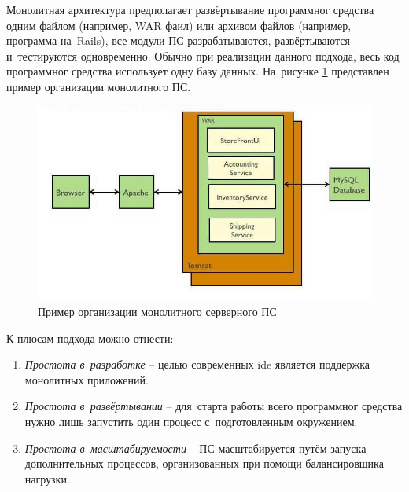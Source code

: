 \subsubsection {}
\label{sec:analysis:research:backArch:monolith}

Монолитная архитектура предполагает развёртывание программног средства одним файлом (например, WAR фаил) или архивом файлов (например, программа на~Rails), все модули ПС разрабатываются, развёртываются и~тестируются одновременно. Обычно при реализации данного подхода, весь код программног средства использует одну базу данных. На~рисунке \ref{sec:analysis:research:arch:back:monolith} представлен пример организации монолитного ПС\cite{microservices:ma}.

\begin{figure}[h]
  \centering
    \includegraphics[width=1\textwidth]{inc/img/backend-monolith.jpg}
  \caption{Пример организации монолитного серверного ПС}
  \label{sec:analysis:research:arch:back:monolith}
\end{figure}

К плюсам подхода можно отнести:

\begin{enumerate}
	\item \emph{Простота в~разработке} -- целью современных \gls{ide} является поддержка монолитных приложений.
	\item \emph{Простота в~развёртывании} -- для~старта работы всего программног средства нужно лишь запустить один процесс с~подготовленным окружением.
	\item \emph{Простота в~масштабируемости} -- ПС масштабируется путём запуска дополнительных процессов, организованных при помощи балансировщика нагрузки.
\end{enumerate}

